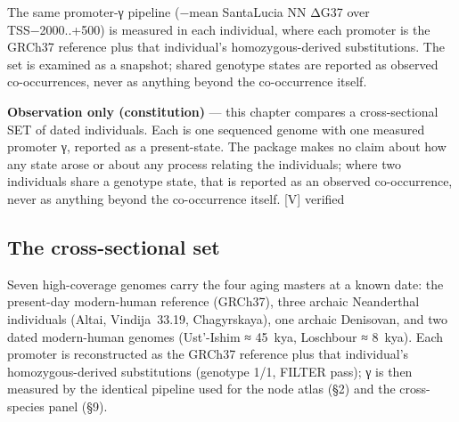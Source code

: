\documentclass[11pt]{article}
\begin{document}
\begin{abstractbox}The same promoter-γ pipeline (−mean SantaLucia NN ΔG37 over TSS−2000..+500) is measured in each individual, where each promoter is the GRCh37 reference plus that individual's homozygous-derived substitutions. The set is examined as a snapshot; shared genotype states are reported as observed co-occurrences, never as anything beyond the co-occurrence itself.\end{abstractbox}

\begin{vpbox}\textbf{Observation only (constitution)} — this chapter compares a cross-sectional SET of dated individuals. Each is one sequenced genome with one measured promoter γ, reported as a present-state. The package makes no claim about how any state arose or about any process relating the individuals; where two individuals share a genotype state, that is reported as an observed co-occurrence, never as anything beyond the co-occurrence itself. [V] verified\end{vpbox}

\subsection*{The cross-sectional set}

Seven high-coverage genomes carry the four aging masters at a known date: the present-day modern-human reference (GRCh37), three archaic Neanderthal individuals (Altai, Vindija 33.19, Chagyrskaya), one archaic Denisovan, and two dated modern-human genomes (Ust'-Ishim ≈ 45 kya, Loschbour ≈ 8 kya). Each promoter is reconstructed as the GRCh37 reference plus that individual's homozygous-derived substitutions (genotype 1/1, FILTER pass); γ is then measured by the identical pipeline used for the node atlas (§2) and the cross-species panel (§9).
\end{document}
